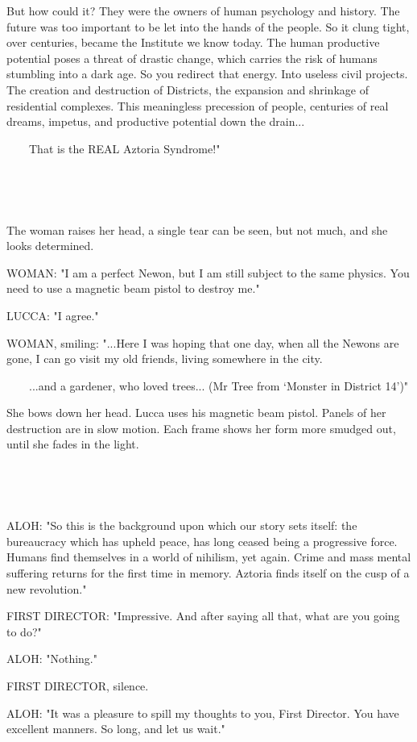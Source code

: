 \documentclass[11pt]{article}
\begin{document}
But how could it? 
They were the owners of human psychology and history.
The future was too important to be let into the hands of the people.
So it clung tight, over centuries, became the Institute we know today.
The human productive potential poses a threat of drastic change, which carries the risk of humans stumbling into a dark age.
So you redirect that energy.
Into useless civil projects.
The creation and destruction of Districts, the expansion and shrinkage of residential complexes.
This meaningless precession of people, centuries of real dreams, impetus, and productive potential down the drain...

\ \ \ \ That is the REAL Aztoria Syndrome!"

\ 

\ 

The woman raises her head, a single tear can be seen, but not much, and she looks determined.

WOMAN: "I am a perfect Newon, but I am still subject to the same physics.
You need to use a magnetic beam pistol to destroy me."

LUCCA: "I agree."

WOMAN, smiling: "...Here I was hoping that one day, when all the Newons are gone, I can go visit my old friends, living somewhere in the city.

\ \ \ \ ...and a gardener, who loved trees... (Mr Tree from `Monster in District 14')"

She bows down her head.
Lucca uses his magnetic beam pistol.
Panels of her destruction are in slow motion.
Each frame shows her form more smudged out, until she fades in the light.

\ 

\ 

ALOH: "So this is the background upon which our story sets itself: 
the bureaucracy which has upheld peace, has long ceased being a progressive force. 
Humans find themselves in a world of nihilism, yet again.
Crime and mass mental suffering returns for the first time in memory.
Aztoria finds itself on the cusp of a new revolution." 

FIRST DIRECTOR: "Impressive. And after saying all that, what are you going to do?"

ALOH: "Nothing."

FIRST DIRECTOR, silence.

ALOH: "It was a pleasure to spill my thoughts to you, First Director.
You have excellent manners.
So long, and let us wait."
\end{document}
